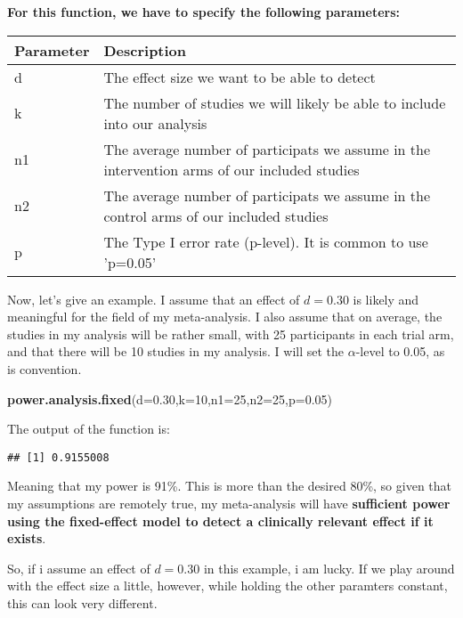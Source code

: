 \documentclass[]{book}
\newenvironment{Shaded}{\begin{snugshade}}{\end{snugshade}}
\newcommand{\KeywordTok}[1]{\textcolor[rgb]{0.13,0.29,0.53}{\textbf{#1}}}
\newcommand{\DataTypeTok}[1]{\textcolor[rgb]{0.13,0.29,0.53}{#1}}
\newcommand{\DecValTok}[1]{\textcolor[rgb]{0.00,0.00,0.81}{#1}}
\newcommand{\FloatTok}[1]{\textcolor[rgb]{0.00,0.00,0.81}{#1}}
\newcommand{\NormalTok}[1]{#1}
\theoremstyle{definition}
\theoremstyle{definition}
\theoremstyle{definition}
\theoremstyle{remark}
\begin{document}
\textbf{For this function, we have to specify the following parameters:}

\begin{tabular}{l|l}
\hline
Parameter & Description\\
\hline
d & The effect size we want to be able to detect\\
\hline
k & The number of studies we will likely be able to include into our analysis\\
\hline
n1 & The average number of participats we assume in the intervention arms of our included studies\\
\hline
n2 & The average number of participats we assume in the control arms of our included studies\\
\hline
p & The Type I error rate (p-level). It is common to use 'p=0.05'\\
\hline
\end{tabular}

Now, let's give an example. I assume that an effect of \(d=0.30\) is
likely and meaningful for the field of my meta-analysis. I also assume
that on average, the studies in my analysis will be rather small, with
25 participants in each trial arm, and that there will be 10 studies in
my analysis. I will set the \(\alpha\)-level to 0.05, as is convention.

\begin{Shaded}
\begin{Highlighting}[]
\KeywordTok{power.analysis.fixed}\NormalTok{(}\DataTypeTok{d=}\FloatTok{0.30}\NormalTok{,}\DataTypeTok{k=}\DecValTok{10}\NormalTok{,}\DataTypeTok{n1=}\DecValTok{25}\NormalTok{,}\DataTypeTok{n2=}\DecValTok{25}\NormalTok{,}\DataTypeTok{p=}\FloatTok{0.05}\NormalTok{)}
\end{Highlighting}
\end{Shaded}

The output of the function is:

\begin{verbatim}
## [1] 0.9155008
\end{verbatim}

Meaning that my power is 91\%. This is more than the desired 80\%, so
given that my assumptions are remotely true, my meta-analysis will have
\textbf{sufficient power using the fixed-effect model to detect a
clinically relevant effect if it exists}.

So, if i assume an effect of \(d = 0.30\) in this example, i am lucky.
If we play around with the effect size a little, however, while holding
the other paramters constant, this can look very different.
\end{document}
